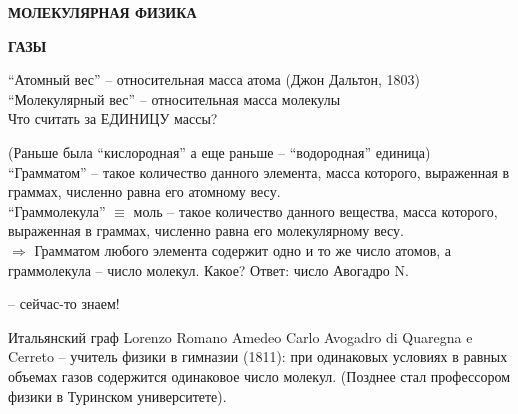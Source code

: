 \documentclass[12pt,epsfig,color,russian]{article}
\begin{document}
\sf\Large

\centerline{\LARGE\bf МОЛЕКУЛЯРНАЯ ФИЗИКА}
\vspace{5mm}
\centerline{\bf ГАЗЫ}
\vspace{5mm}
\noindent
``Атомный вес'' -- относительная масса атома (Джон Дальтон, 1803)\\
``Молекулярный вес'' -- относительная масса молекулы\\
Что считать за ЕДИНИЦУ массы?
\begin{center}
{}
\end{center}
(Раньше была ``кислородная'' а еще раньше -- ``водородная'' единица)\\
``Грамматом'' -- такое количество данного элемента, масса которого, вы\-ра\-жен\-ная в граммах, численно равна его атомному весу.\\
``Граммолекула'' $\equiv$ моль -- такое количество данного вещества, масса ко\-то\-ро\-го, выраженная в граммах, численно равна его молекулярному весу.\\
 $\Rightarrow$ Грамматом любого элемента содержит одно и то же число атомов, а граммолекула -- число молекул. Какое? Ответ: число Авогадро N.
\begin{center}
{} -- сейчас-то знаем!
\end{center}
Итальянский граф Lorenzo Romano Amedeo Carlo Avogadro di Quaregna e Cerreto -- учитель физики в гимназии (1811): при одинаковых условиях в равных объемах газов содержится одинаковое число молекул. (Позднее стал профессором физики в Туринском университете).
\end{document}
